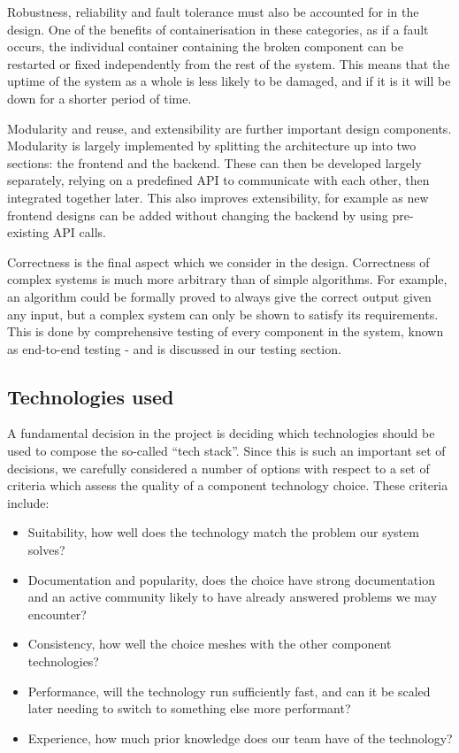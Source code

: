 \documentclass[10pt]{article}
\begin{document}
Robustness, reliability and fault tolerance must also be accounted for in the
design. One of the benefits of containerisation in these categories, as if a
fault occurs, the individual container containing the broken component can be
restarted or fixed independently from the rest of the system. This means that
the uptime of the system as a whole is less likely to be damaged, and if it is
it will be down for a shorter period of time.

Modularity and reuse, and extensibility are further important design components.
Modularity is largely implemented by splitting the architecture up into two
sections: the frontend and the backend. These can then be developed largely
separately, relying on a predefined API to communicate with each other, then
integrated together later. This also improves extensibility, for example as new
frontend designs can be added without changing the backend by using pre-existing
API calls.

Correctness is the final aspect which we consider in the design. Correctness of
complex systems is much more arbitrary than of simple algorithms. For example,
an algorithm could be formally proved to always give the correct output given
any input, but a complex system can only be shown to satisfy its requirements.
This is done by comprehensive testing of every component in the system, known as
end-to-end testing - and is discussed in our testing section.


\subsection{Technologies used}

A fundamental decision in the project is deciding which technologies should be
used to compose the so-called ``tech stack''. Since this is such an important set
of decisions, we carefully considered a number of options with respect to a set
of criteria which assess the quality of a component technology choice. These
criteria include:
\begin{itemize}[leftmargin=1.2cm,noitemsep,align=left]
    \item
        Suitability, how well does the technology match the problem
        our system solves?
    \item
        Documentation and popularity, does the choice have strong
        documentation and an active community likely to have already answered problems
        we may encounter?
    \item
        Consistency, how well the choice meshes with the other
        component technologies?
    \item
        Performance, will the technology run sufficiently fast,
        and can it be scaled later needing to switch to something else more performant?
    \item
        Experience, how much prior knowledge does our team have of the technology?
\end{itemize}
\end{document}
